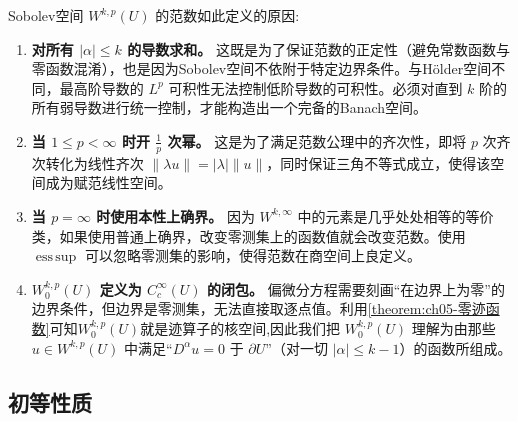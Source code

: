 \documentclass[../../main.tex]{subfiles}
\begin{document}
\begin{remark}
Sobolev空间 \(W^{k,p}(U)\) 的范数如此定义的原因:
\begin{enumerate}[(1)]
\item \textbf{对所有 \(|\alpha|\leqslant k\) 的导数求和。} 这既是为了保证范数的正定性（避免常数函数与零函数混淆），也是因为Sobolev空间不依附于特定边界条件。与H\"older空间不同，最高阶导数的 \(L^p\) 可积性无法控制低阶导数的可积性。必须对直到 \(k\) 阶的所有弱导数进行统一控制，才能构造出一个完备的Banach空间。
\item \textbf{当 \(1\leqslant p<\infty\) 时开 \(\frac{1}{p}\) 次幂。} 这是为了满足范数公理中的齐次性，即将 \(p\) 次齐次转化为线性齐次 \(\|\lambda u\|=|\lambda|\|u\|\)，同时保证三角不等式成立，使得该空间成为赋范线性空间。

\item \textbf{当 \(p=\infty\) 时使用本性上确界。} 因为 \(W^{k,\infty}\) 中的元素是几乎处处相等的等价类，如果使用普通上确界，改变零测集上的函数值就会改变范数。使用 \(\operatorname*{ess\,sup}\) 可以忽略零测集的影响，使得范数在商空间上良定义。

\item \textbf{\(W_0^{k,p}(U)\) 定义为 \(C_c^\infty(U)\) 的闭包。} 偏微分方程需要刻画“在边界上为零”的边界条件，但边界是零测集，无法直接取逐点值。利用\cref{theorem:ch05-零迹函数}可知$W_0^{k,p}(U)$就是迹算子的核空间,因此我们把 $W^{k,p}_{0}(U)$ 理解为由那些 $u\in W^{k,p}(U)$ 中满足“$D^{\alpha}u=0$ 于 $\partial U$”（对一切 $|\alpha|\leqslant k-1$）的函数所组成。
\end{enumerate}
\end{remark}


\subsection{初等性质}\label{subsection:ch05-初等性质}
\end{document}
